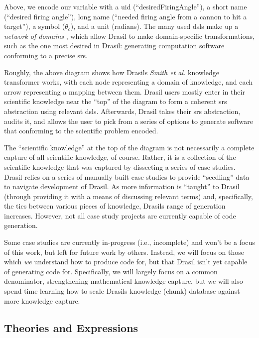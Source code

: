 \exampleAngleVariableEncoding{}

Above, we encode our variable with a \acs{uid} (``desiredFiringAngle''), a short
name (``desired firing angle''), long name (``needed firing angle from a cannon
to hit a target''), a symbol (\(\theta{}_{c}\)), and a unit (radians). The many
used \acsp{dsl} make up a \textit{network of domains} \cite{Czarnecki2005},
which allow Drasil to make domain-specific transformations, such as the one most
desired in Drasil: generating computation software conforming to a precise
\acs{srs}.

\roughNetworkOfDomainsIntro{}

Roughly, the above diagram shows how Drasils \textit{Smith et al.} knowledge
transformer works, with each node representing a domain of knowledge, and each
arrow representing a mapping between them. Drasil users mostly enter in their
scientific knowledge near the ``top'' of the diagram to form a coherent
\acs{srs} abstraction using relevant \acsp{dsl}. Afterwards, Drasil takes their
\acs{srs} abstraction, audits it, and allows the user to pick from a series of
options to generate software that conforming to the scientific problem encoded.

The ``scientific knowledge'' at the top of the diagram is not necessarily a
complete capture of all scientific knowledge, of course. Rather, it is a
collection of the scientific knowledge that was captured by dissecting a series
of case studies. Drasil relies on a series of manually built case studies to
provide ``seedling'' data to navigate development of Drasil. As more information
is ``taught'' to Drasil (through providing it with a means of discussing
relevant terms) and, specifically, the ties between various pieces of knowledge,
Drasils range of generation increases. However, not all case study projects are
currently capable of code generation.

Some case studies are currently in-progress (i.e., incomplete) and won't be a
focus of this work, but left for future work by others. Instead, we will focus
on those which \textit{we} understand how to produce code for, but that Drasil
isn't yet capable of generating code for. Specifically, we will largely focus on
a common denominator, strengthening mathematical knowledge capture, but we will
also spend time learning how to scale Drasils knowledge (chunk) database against
more knowledge capture.

\subsection{Theories and Expressions}

